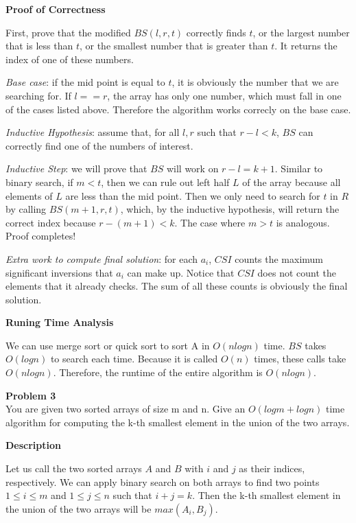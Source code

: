 \documentclass[12pt,article]{article}
\newenvironment{problem}[2][Problem]
    { \begin{mdframed}[backgroundcolor=gray!20] \textbf{#1 #2} \\}
    {  \end{mdframed}}
\begin{document}
\textbf{Proof of Correctness}

First, prove that the modified $BS(l,r,t)$ correctly finds $t$, or the largest number that is less than $t$, or the smallest number that is greater than $t$. It returns the index of one of these numbers.

\textit{Base case}: if the mid point is equal to $t$, it is obviously the number that we are searching for. If $l == r$, the array has only one number, which must fall in one of the cases listed above. Therefore the algorithm works correcly on the base case.

\textit{Inductive Hypothesis}: assume that, for all $l,r$ such that $r - l < k$, $BS$ can correctly find one of the numbers of interest.

\textit{Inductive Step}: we will prove that $BS$ will work on $r - l = k + 1$. Similar to binary search, if $m < t$, then we can rule out left half $L$ of the array because all elements of $L$ are less than the mid point. Then we only need to search for $t$ in $R$ by calling $BS(m+1,r,t)$, which, by the inductive hypothesis, will return the correct index because $r - (m + 1) < k$. The case where $m > t$ is analogous. Proof completes!

\textit{Extra work to compute final solution}: for each $a_i$, $CSI$ counts the maximum significant inversions that $a_i$ can make up. Notice that $CSI$ does not count the elements that it already checks. The sum of all these counts is obviously the final solution.

\textbf{Runing Time Analysis}

We can use merge sort or quick sort to sort A in $O(nlogn)$ time. $BS$ takes $O(logn)$ to search each time. Because it is called $O(n)$ times, these calls take  $O(nlogn)$. Therefore, the runtime of the entire algorithm is $O(nlogn)$.

\newpage
\begin{problem}{3} 
You are given two sorted arrays of size m and n. Give an $O(logm + logn)$ time algorithm for computing the k-th smallest element in the union of the two arrays.
\end{problem}

\textbf{Description}

Let us call the two sorted arrays $A$ and $B$ with $i$ and $j$ as their indices, respectively. We can apply binary search on both arrays to find two points $1 \leq i \leq m$ and $1 \leq j \leq n$ such that $i + j = k$. Then the k-th smallest element in the union of the two arrays will be $max(A_i,B_j)$.
\end{document}
